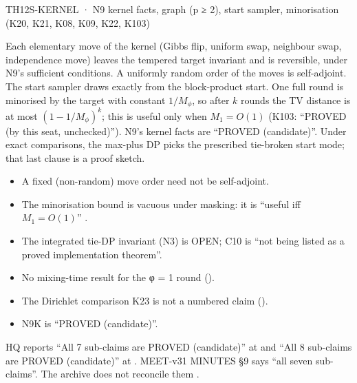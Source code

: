\begin{card}{TH12}{S-KERNEL · N9 kernel facts, graph (p ≥ 2), start sampler, minorisation (K20, K21, K08, K09, K22, K103)}
\begin{plain}
Each elementary move of the kernel (Gibbs flip, uniform swap, neighbour swap, independence move) leaves the tempered target invariant and is reversible, under N9's sufficient conditions. A uniformly random order of the moves is self-adjoint. The start sampler draws exactly from the block-product start. One full round is minorised by the target with constant $1/M_\phi$, so after $k$ rounds the TV distance is at most $(1-1/M_\phi)^k$; this is useful only when $M_1=O(1)$ (K103: ``PROVED (by this seat, unchecked)''). N9's kernel facts are ``PROVED (candidate)''. Under exact comparisons, the max-plus DP picks the prescribed tie-broken start mode; that last clause is a proof sketch.
\end{plain}
\begin{notproved}
\begin{itemize}
\item A fixed (non-random) move order need not be self-adjoint.
\item The minorisation bound is vacuous under masking: it is ``useful iff $M_1=O(1)$'' .
\item The integrated tie-DP invariant (N3) is OPEN; C10 is ``not being listed as a proved implementation theorem''.
\item No mixing-time result for the φ = 1 round ().
\item The Dirichlet comparison K23 is not a numbered claim ().
\item N9K is ``PROVED (candidate)''.
\end{itemize}
\end{notproved}
\begin{uncertain}
HQ reports ``All 7 sub-claims are PROVED (candidate)'' at  and ``All 8 sub-claims are PROVED (candidate)'' at . MEET-v31 MINUTES §9 says ``all seven sub-claims''. The archive does not reconcile them .
\end{uncertain}
\end{card}

